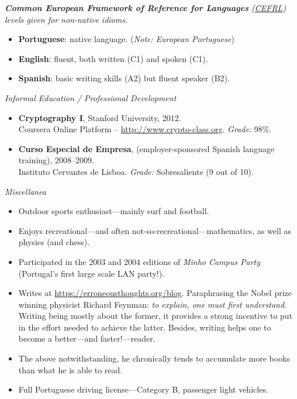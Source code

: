 \documentclass[a4paper,10pt]{extarticle}
\newenvironment{topic}[1]
   {{\noindent\large\bfseries\raisebox{0pt}[\height][1ex]{#1}\hrule\par}%
    \begin{list}{}{%
       \setlength{\leftmargin}{.0cm}}\item[]}
   {\end{list}\medskip}
\begin{document}
\begin{topic}{Languages}
  {\hspace*{2em} \slshape \small \textbf{Common European Framework of Reference for Languages} 
	(\href{http://en.wikipedia.org/wiki/Common\_European\_Framework\_of\_Reference\_for\_Languages#Common\_reference\_levels}{CEFRL}) 
	levels given for non-native idioms.}
  \begin{itemize}[leftmargin=*]
    \item {\bfseries Portuguese}: native language. (\emph{Note: European Portuguese})
    \item {\bfseries English}: fluent, both written (C1) and spoken (C1).
    \item {\bfseries Spanish}: basic writing skills (A2) but fluent speaker (B2).
  \end{itemize}
\end{topic}

\newpage
\begin{topic}{Additional Information}
  {\hspace*{2em} \itshape Informal Education / Professional Development}
  \begin{itemize}[leftmargin=*]
    \item {\bfseries Cryptography I}, Stanford University, 2012.\\
      Coursera Online Platform -- \url{http://www.crypto-class.org}. \emph{Grade:} 98\%.
    \item {\bfseries Curso Especial de Empresa}, (employer-sponsored Spanish language training), 2008--2009.\\
			Instituto Cervantes de Lisboa. \emph{Grade:} Sobresaliente (9 out of 10).
  \end{itemize}
  {\hspace*{2em} \itshape Miscellanea}  
  \begin{itemize}[leftmargin=*]
    \item{Outdoor sports enthusiast---mainly surf and football.}
    \item{Enjoys recreational---and often not-so-recreational---mathematics,
      as well as physics (and chess).}
    \item{Participated in the 2003 and 2004 editions of \emph{Minho Campus
			Party} (Portugal's first large scale LAN party!).}
		\item Writes at \url{https://erroneousthoughts.org/blog}. Paraphrasing the 
			Nobel prize winning physicist Richard Feynman: \emph{to explain, one must 
			first understand}. Writing being mostly about the former, it provides a 
			strong incentive to put in the effort needed to achieve the latter. 
			Besides, writing helps one to become a better---and faster!---reader.
    \item The above notwithstanding, he chronically tends to accumulate more books than 
      what he is able to read.
    \item{Full Portuguese driving license---Category B, passenger light
      vehicles.}
  \end{itemize}
\end{topic}
\end{document}
